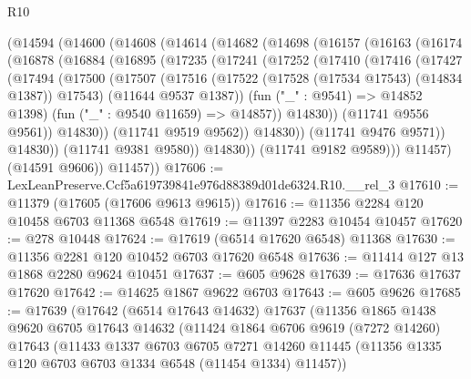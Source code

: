 \begin{lexlean}{R10}
\begin{coremodule}
    (@14594
      (@14600
        (@14608
          (@14614
            (@14682
              (@14698
                (@16157
                  (@16163
                    (@16174
                      (@16878
                        (@16884
                          (@16895
                            (@17235
                              (@17241
                                (@17252
                                  (@17410
                                    (@17416
                                      (@17427
                                        (@17494
                                          (@17500
                                            (@17507
                                              (@17516
                                                (@17522
                                                  (@17528 (@17534 @17543) (@14834 @1387))
                                                  @17543)
                                                (@11644 @9537 @1387))
                                              (fun ("_" : @9541) => @14852 @1398)
                                              (fun ("_" : @9540 @11659) => @14857))
                                            @14830))
                                        (@11741 @9556 @9561))
                                      @14830))
                                  (@11741 @9519 @9562))
                                @14830))
                            (@11741 @9476 @9571))
                          @14830))
                      (@11741 @9381 @9580))
                    @14830))
                (@11741 @9182 @9589)))
            @11457)
          (@14591 @9606))
        @11457))
@17606 := LexLeanPreserve.Ccf5a619739841e976d88389d01de6324.R10.__rel_3
@17610 := @11379 (@17605 (@17606 @9613 @9615))
@17616 := @11356 @2284 @120 @10458 @6703 @11368 @6548
@17619 := @11397 @2283 @10454 @10457
@17620 := @278 @10448
@17624 := @17619 (@6514 @17620 @6548) @11368
@17630 := @11356 @2281 @120 @10452 @6703 @17620 @6548
@17636 := @11414 @127 @13 @1868 @2280 @9624 @10451
@17637 := @605 @9628
@17639 := @17636 @17637 @17620
@17642 := @14625 @1867 @9622 @6703
@17643 := @605 @9626
@17685 := @17639
    (@17642
      (@6514 @17643 @14632)
      @17637
      (@11356
        @1865
        @1438
        @9620
        @6705
        @17643
        @14632
        (@11424
          @1864
          @6706
          @9619
          (@7272 @14260)
          @17643
          (@11433
            @1337
            @6703
            @6705
            @7271
            @14260
            @11445
            (@11356 @1335 @120 @6703 @6703 @1334 @6548 (@11454 @1334) @11457))

\end{coremodule}
\end{lexlean}
